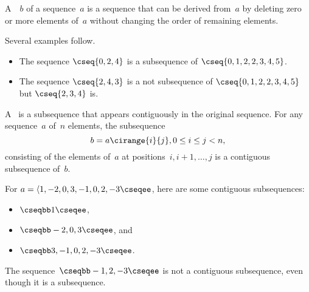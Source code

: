 \begin{flex}
\label{grp:def:mcss::introduction::subseq}

\begin{definition}[Subsequence]
\label{def:mcss::introduction::subseq}

A~~$b$ of a sequence~$a$ is a sequence that can be
derived from~$a$ by deleting zero or more elements of~$a$ without changing the
order of remaining elements. 

\end{definition}

\begin{example}
\label{xmpl:mcss::follow}
Several examples follow.
\begin{itemize}
\item
The sequence $\cseq{0,2,4}$ is a subsequence of
$\cseq{0,1,2,2,3,4,5}$.

\item
The sequence $\cseq{2,4,3}$ is a not
subsequence of $\cseq{0,1,2,2,3,4,5}$ but $\cseq{2,3,4}$ is.
\end{itemize}

\end{example}
\end{flex}

\begin{flex}
\label{grp:def:mcss::introduction::consubseq}

\begin{definition}
\label{def:mcss::introduction::consubseq}
A~ is a subsequence that appears
contiguously in the original sequence.
For any sequence~$a$ of~$n$ elements, the subsequence
\[
b =  a\cirange{i}{j}, 0 \le i \le j < n,
\]
consisting of the elements of~$a$ at positions~$i, i+1, \ldots, j$ is
a contiguous subsequence of~$b$.

\end{definition}

\begin{example}
\label{xmpl:mcss::contiguous}
For $a = \langle 1, -2, 0, 3, -1, 0, 2, -3 \cseqee$, here are some
contiguous subsequences:
\begin{itemize}
\item 
$\cseqbb 1 \cseqee$,

\item
$\cseqbb -2, 0, 3 \cseqee$, and

\item
$\cseqbb 3, -1,  0, 2, -3 \cseqee$.

\end{itemize}

The sequence~$\cseqbb -1,2,-3 \cseqee$ is not a contiguous subsequence,
even though it is a subsequence.

\end{example}
\end{flex}

